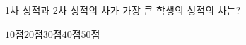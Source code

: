 1차 성적과 2차 성적의 차가 가장 큰 학생의 성적의 차는?
\begin{choices32}{$10$점}{$20$점}{$30$점}{$40$점}{$50$점}\end{choices32}
